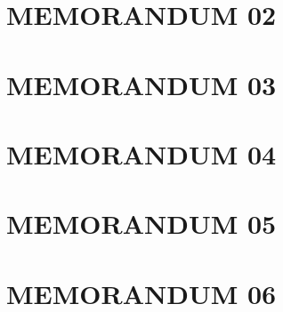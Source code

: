 \documentclass[paper=A4, fontsize=11pt, titlepage]{article}
\numberwithin{equation}{section}
\numberwithin{figure}{section}
\numberwithin{table}{section}
\newcommand*{\sectionpostamble}{}
\newcommand*{\fromto}[1]{\def\sectionpostamble{#1}}
\begin{document}




\clearpage


\fromto{May 5 - May 9}
\section{MEMORANDUM 02}




\clearpage


\fromto{May 12 - May 16}
\section{MEMORANDUM 03}




\clearpage


\fromto{May 19 - May 23}
\section{MEMORANDUM 04}




\clearpage


\fromto{May 26 - May 30}
\section{MEMORANDUM 05}




\clearpage


\fromto{Jun 02 - Jun 06}
\section{MEMORANDUM 06}




\clearpage


\fromto{Jun 09 - Jun 13}
\end{document}
